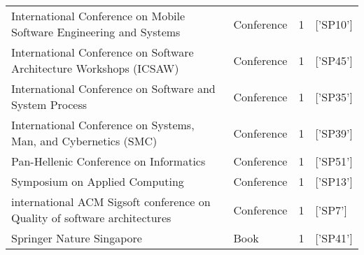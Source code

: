 \begin{tabular}{llrl}
                              International Conference on Mobile Software Engineering and Systems &  Conference &      1 &                                                 ['SP10'] \\
                              International Conference on Software Architecture Workshops (ICSAW) &  Conference &      1 &                                                 ['SP45'] \\
                                          International Conference on Software and System Process &  Conference &      1 &                                                 ['SP35'] \\
                                  International Conference on Systems, Man, and Cybernetics (SMC) &  Conference &      1 &                                                 ['SP39'] \\
                                                           Pan-Hellenic Conference on Informatics &  Conference &      1 &                                                 ['SP51'] \\
                                                                   Symposium on Applied Computing &  Conference &      1 &                                                 ['SP13'] \\
                        international ACM Sigsoft conference on Quality of software architectures &  Conference &      1 &                                                  ['SP7'] \\
                                                                        Springer Nature Singapore &        Book &      1 &                                                 ['SP41'] \\
\bottomrule
\end{tabular}
